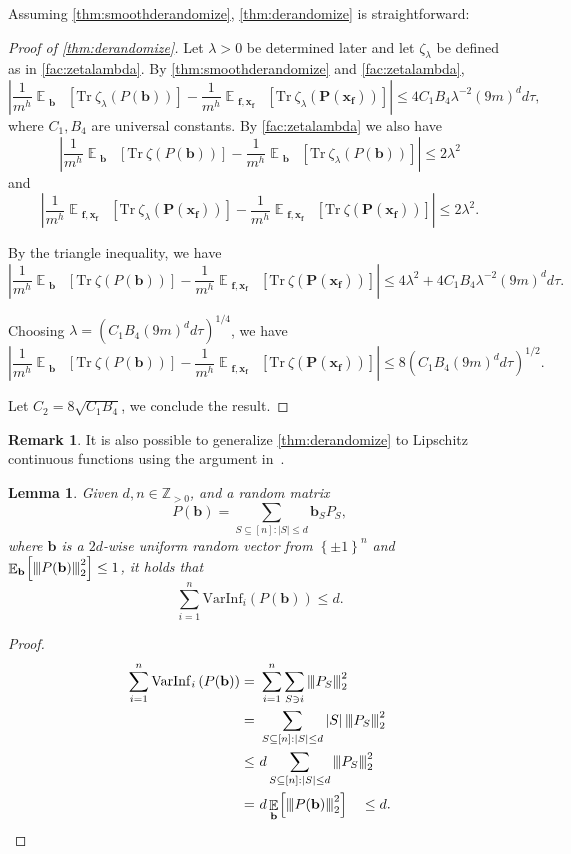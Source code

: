 \documentclass[10pt,a4paper]{article}
\theoremstyle{plain}
\newtheorem{lemma}[theorem]{Lemma}
\theoremstyle{definition}
\newtheorem{remark}[theorem]{Remark}
\newcommand {\minusspace} {\: \! \!}
\newcommand {\Fn} [2] {\ensuremath{ #1 \minusspace \Br{ #2 } }}
\newcommand {\set} [1] {\ensuremath{ \left\lbrace #1 \right\rbrace }}
\newcommand {\br} [1] {\ensuremath{ \left( #1 \right) }}
\newcommand {\Br} [1] {\ensuremath{ \left[ #1 \right] }}
\newcommand {\ab} [1] {\ensuremath{ \left| #1 \right| }}
\DeclareMathOperator*{\bigE}{\mathbb{E}}
\newcommand {\expec} [2] {\Fn{\bigE_{\substack{#1}}}{#2}}
\newcommand{\nnorm}[1]{{\left\vert\kern-0.25ex\left\vert\kern-0.25ex\left\vert #1
		\right\vert\kern-0.25ex\right\vert\kern-0.25ex\right\vert}}
\newcommand {\Tr} {\ensuremath{ \mathrm{Tr} }}
\newcommand{\posint}{{\mathbb Z}_{>0}}
\newcommand{\randP}{\ensuremath{\mathbf{P}}}
\newcommand{\randb}{\ensuremath{\mathbf{b}}}
\newcommand{\randx}{\ensuremath{\mathbf{x}}}
\newcommand{\randf}{\ensuremath{\mathbf{f}}}
\newcommand{\varinfi}[1]{\ensuremath{\mathrm{VarInf}_i}\br{#1}}
\newcommand{\1}{\mathbb{1}} %
\begin{document}
Assuming \cref{thm:smoothderandomize}, \cref{thm:derandomize} is straightforward: 

\begin{proof}[Proof of \cref{thm:derandomize}]
Let $\lambda>0$ be determined later and let $\zeta_\lambda$ be defined as in \cref{fac:zetalambda}. By \cref{thm:smoothderandomize} and \cref{fac:zetalambda},
\[\ab{\frac{1}{m^h}\expec{\randb}{\Tr~\zeta_\lambda\br{P(\randb)}}-\frac{1}{m^h}\expec{\randf,\randx_\randf}{\Tr~\zeta_\lambda\br{\randP(\randx_\randf)}}}\leq 4C_1B_4\lambda^{-2}(9m)^dd\tau,\]
where $C_1,B_4$ are universal constants. By \cref{fac:zetalambda} we also have
\[\ab{\frac{1}{m^h}\expec{\randb}{\Tr~\zeta\br{P(\randb)}}-\frac{1}{m^h}\expec{\randb}{\Tr~\zeta_\lambda\br{P(\randb)}}}\leq 2\lambda^2\]
and
\[\ab{\frac{1}{m^h}\expec{\randf,\randx_\randf}{\Tr~\zeta_\lambda\br{\randP(\randx_\randf)}}-\frac{1}{m^h}\expec{\randf,\randx_\randf}{\Tr~\zeta\br{\randP(\randx_\randf)}}}\leq 2\lambda^2.\]

By the triangle inequality, we have
\[\ab{\frac{1}{m^h}\expec{\randb}{\Tr~\zeta\br{P(\randb)}}-\frac{1}{m^h}\expec{\randf,\randx_\randf}{\Tr~\zeta\br{\randP(\randx_\randf)}}}\leq4\lambda^2+4C_1B_4\lambda^{-2}(9m)^dd\tau.\]

Choosing $\lambda=\br{C_1B_4(9m)^dd\tau}^{1/4}$, we have
\[\ab{\frac{1}{m^h}\expec{\randb}{\Tr~\zeta\br{P(\randb)}}-\frac{1}{m^h}\expec{\randf,\randx_\randf}{\Tr~\zeta\br{\randP(\randx_\randf)}}}\leq8\br{C_1B_4(9m)^dd\tau}^{1/2}.\]

Let $C_2=8\sqrt{C_1B_4}$, we conclude the result.
\end{proof}

\begin{remark}
It is also possible to generalize \cref{thm:derandomize} to Lipschitz continuous functions using the argument in~\cite[Lemma 3.5]{isaksson2012maximally}.
\end{remark}

\begin{lemma}\label{lem:simpletotalinf}
Given $d,n\in\posint$, and a random matrix
\[P(\randb)=\sum_{S\subseteq[n]:\ab{S}\leq d}\randb_SP_S,\]
where $\randb$ is a $2d$-wise uniform random vector from $\set{\pm 1}^n$ and $\expec{\randb}{\nnorm{P(\randb)}_2^2}\leq1$, it holds that  
\[\sum_{i=1}^n\varinfi{P(\randb)}\leq d.\]
\end{lemma}

\begin{proof}
    \begin{align*} \sum_{i=1}^n\varinfi{P(\randb)}=~&\sum_{i=1}^n\sum_{S\ni i}\nnorm{P_S}_2^2\\
    =~&\sum_{S\subseteq[n]:\ab{S}\leq d}\ab{S}\nnorm{P_S}_2^2\\
    \leq~&d\sum_{S\subseteq[n]:\ab{S}\leq d}\nnorm{P_S}_2^2\\
    =~&d\expec{\randb}{\nnorm{P(\randb)}_2^2}\quad\leq d.
    \end{align*} 
\end{proof}
\end{document}
